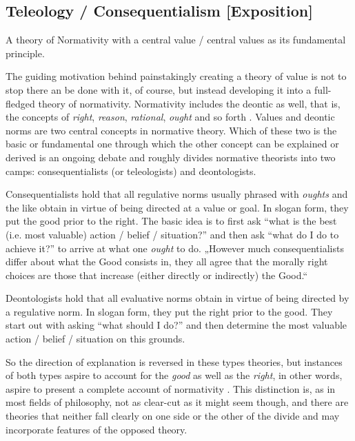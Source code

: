 \documentclass[12pt,numbers=noenddot]{scrartcl}
\begin{document}

\subsection{ Teleology / Consequentialism [Exposition]} \label{subsec: teleology}
A theory of Normativity with a central value / central values as its fundamental principle.

The guiding motivation behind painstakingly creating a theory of value is not to stop there an be done with it, of course, but instead developing it into a full-fledged theory of normativity. Normativity includes the deontic as well, that is, the concepts of \emph{right}, \emph{reason}, \emph{rational}, \emph{ought} and so forth \autocite[21]{sep-value-theory}. Values and deontic norms are two central concepts in normative theory. Which of these two is the basic or fundamental one through which the other concept can be explained or derived is an ongoing debate and roughly divides normative theorists into two camps: consequentialists (or teleologists) and deontologists. 

Consequentialists hold that all regulative norms usually phrased with \emph{oughts} and the like obtain in virtue of being directed at a value or goal. In slogan form, they put the good prior to the right. The basic idea is to first ask “what is the best (i.e. most valuable) action / belief / situation?” and then ask “what do I do to achieve it?” to arrive at what one \emph{ought} to do. „However much consequentialists differ about what the Good consists in, they all agree that the morally right choices are those that increase (either directly or indirectly) the Good.“ \autocite{sep-ethics-deontological}

Deontologists hold that all evaluative norms obtain in virtue of being directed by a regulative norm. In slogan form, they put the right prior to the good. They start out with asking “what should I do?” and then determine the most valuable action / belief / situation on this grounds. 

So the direction of explanation is reversed in these types theories, but instances of both types aspire to account for the \emph{good} as well as the \emph{right}, in other words, aspire to present a complete account of normativity \parencite[341]{Berker2013-BERETA-2}. This distinction is, as in most fields of philosophy, not as clear-cut as it might seem though, and there are theories that neither fall clearly on one side or the other of the divide and may incorporate features of the opposed theory.
\end{document}
